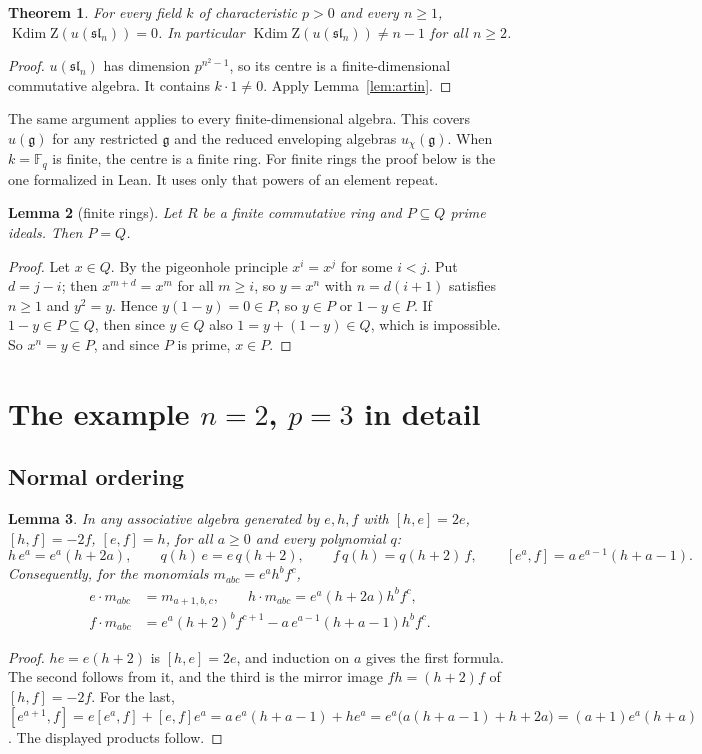 \documentclass[11pt]{article}
\newtheorem{theorem}{Theorem}
\newtheorem{lemma}[theorem]{Lemma}
\theoremstyle{definition}
\theoremstyle{remark}
\newcommand{\F}{\mathbb{F}}
\newcommand{\Z}{\mathrm{Z}}
\newcommand{\sln}{\mathfrak{sl}_n}
\newcommand{\g}{\mathfrak{g}}
\newcommand{\kdim}{\operatorname{Kdim}}
\begin{document}
\begin{theorem}\label{thm:main}
For every field $k$ of characteristic $p>0$ and every $n\ge 1$, $\kdim\Z(u(\sln))=0$. In
particular $\kdim\Z(u(\sln))\neq n-1$ for all $n\ge 2$.
\end{theorem}
\begin{proof}
$u(\sln)$ has dimension $p^{n^2-1}$, so its centre is a finite-dimensional commutative algebra.
It contains $k\cdot 1\neq 0$. Apply Lemma~\ref{lem:artin}.
\end{proof}

The same argument applies to every finite-dimensional algebra. This covers $u(\g)$ for any
restricted $\g$ and the reduced enveloping algebras $u_\chi(\g)$. When $k=\F_q$ is finite, the
centre is a finite ring. For finite rings the proof below is the one formalized in Lean. It
uses only that powers of an element repeat.

\begin{lemma}[finite rings]\label{lem:finite}
Let $R$ be a finite commutative ring and $P\subseteq Q$ prime ideals. Then $P=Q$.
\end{lemma}
\begin{proof}
Let $x\in Q$. By the pigeonhole principle $x^i=x^j$ for some $i<j$. Put $d=j-i$; then
$x^{m+d}=x^m$ for all $m\ge i$, so $y=x^n$ with $n=d(i+1)$ satisfies $n\ge 1$ and $y^2=y$. Hence
$y(1-y)=0\in P$, so $y\in P$ or $1-y\in P$. If $1-y\in P\subseteq Q$, then since $y\in Q$ also
$1=y+(1-y)\in Q$, which is impossible. So $x^n=y\in P$, and since $P$ is prime, $x\in P$.
\end{proof}

\section{The example \texorpdfstring{$n=2$, $p=3$}{n=2, p=3} in detail}

\subsection{Normal ordering}
\begin{lemma}\label{lem:formulas}
In any associative algebra generated by $e,h,f$ with $[h,e]=2e$, $[h,f]=-2f$, $[e,f]=h$, for
all $a\ge 0$ and every polynomial $q$:
\[
h\,e^a=e^a(h+2a),\qquad q(h)\,e=e\,q(h+2),\qquad f\,q(h)=q(h+2)\,f,\qquad
[e^a,f]=a\,e^{a-1}(h+a-1).
\]
Consequently, for the monomials $m_{abc}=e^ah^bf^c$,
\begin{align*}
e\cdot m_{abc}&=m_{a+1,b,c},\qquad
h\cdot m_{abc}=e^a(h+2a)h^bf^c,\\
f\cdot m_{abc}&=e^a(h+2)^bf^{c+1}-a\,e^{a-1}(h+a-1)h^bf^c .
\end{align*}
\end{lemma}
\begin{proof}
$he=e(h+2)$ is $[h,e]=2e$, and induction on $a$ gives the first formula. The second follows
from it, and the third is the mirror image $fh=(h+2)f$ of $[h,f]=-2f$. For the last,
$[e^{a+1},f]=e[e^a,f]+[e,f]e^a=a\,e^{a}(h+a-1)+he^a=e^a\bigl(a(h+a-1)+h+2a\bigr)
=(a+1)e^a(h+a)$. The displayed products follow.
\end{proof}
\end{document}
